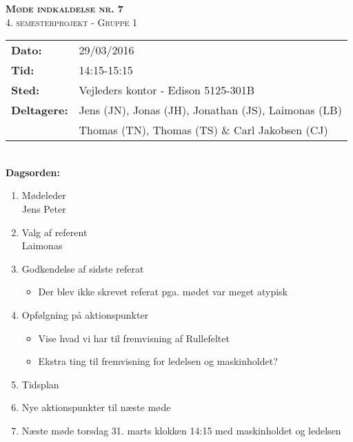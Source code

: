 
\newcommand{\HRule}{\rule{\linewidth}{0.1mm}}


	\begin{center}
		{\huge \bfseries \textsc{Møde indkaldelse nr. 7}}\\
		\textsc{\large 4. semesterprojekt - Gruppe 1}\\[0.3cm]
	\end{center}
	\begin{tabular}{ll}
	\large \textbf{Dato:} & 29/03/2016  \\ %
	\large \textbf{Tid:}  & 14:15-15:15 \\ %
	\large \textbf{Sted:} & Vejleders kontor - Edison 5125-301B		\\ %
	\large \textbf{Deltagere:} & Jens (JN), Jonas (JH), Jonathan (JS), Laimonas (LB) \\
	\large \textbf & Thomas (TN),  Thomas (TS) \& Carl Jakobsen (CJ)\\
	\end{tabular}\\
	\phantom{\,}\hspace{0.1em} \large \textbf{Dagsorden:}
	\begin{enumerate}
		\itemsep 0.3em 
		\item Mødeleder\\
			Jens Peter\\
		\item Valg af referent\\
			Laimonas\\
		\item Godkendelse af sidste referat
		\begin{itemize}
			\itemsep 0.3em
			\item Der blev ikke skrevet referat pga. mødet var meget atypisk\\
		\end{itemize}
		\item Opfølgning på aktionspunkter
		\begin{itemize}
			\itemsep 0.3em
			\item Vise hvad vi har til fremvisning af Rullefeltet
			\item Ekstra ting til fremvisning for ledelsen og maskinholdet?\\
		\end{itemize}
		\item Tidsplan\\
		\item Nye aktionspunkter til næste møde\\
		\item Næste møde torsdag 31. marts klokken 14:15 med maskinholdet og ledelsen
	\end{enumerate}

